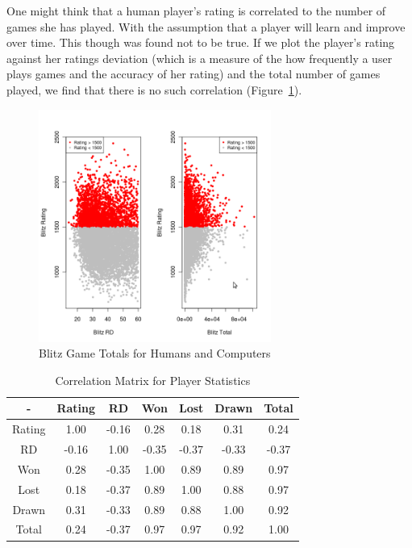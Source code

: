 \documentclass{article}
\begin{document}
One might think that a human player's rating is correlated to the number of games she has played. With the assumption that a player will learn and improve over time. This though was found not to be true. If we plot the player's rating against her ratings deviation (which is a measure of the how frequently a user plays games and the accuracy of her rating) and the total number of games played, we find that there is no such correlation (Figure~\ref{fig:ratingsrdtotal}).\\

\begin{figure} [htp]
\begin{center}
\includegraphics[width=3in]{ratings_rd_total.png}
\end{center}
\caption{Blitz Game Totals for Humans and Computers}
\label{fig:ratingsrdtotal}
\end{figure}

\begin{table}[htp]
\begin{center}
\begin{tabular}{|c|c|c|c|c|c|c|}
\hline

- & Rating & RD & Won & Lost & Drawn & Total \\
\hline
Rating & 1.00 & -0.16 & 0.28 & 0.18 & 0.31 & 0.24\\
\hline
RD & -0.16 & 1.00 & -0.35 & -0.37 & -0.33 & -0.37\\
\hline
Won & 0.28 & -0.35 & 1.00 & 0.89 & 0.89 & 0.97\\
\hline
Lost & 0.18 & -0.37 & 0.89 & 1.00 & 0.88 & 0.97\\
\hline
Drawn & 0.31 & -0.33 & 0.89 & 0.88 & 1.00 & 0.92\\
\hline
Total & 0.24 & -0.37 & 0.97 & 0.97 & 0.92 & 1.00\\
\hline
\end{tabular}
\end{center}
\caption{Correlation Matrix for Player Statistics}
\label{tab:playercor}
\end{table}
\end{document}
